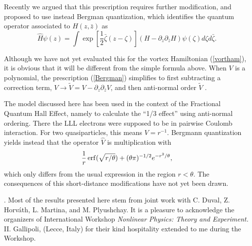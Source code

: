 \documentclass[a4paper,12pt]{article}
\newcommand\half{{\scriptstyle{\frac{1}{2}}}}
\begin{document}
Recently\cite{DH} we argued that 
this prescription requires further modification,
and proposed to use instead 
Bergman  quantization\cite{Bergman}, which identifies
the quantum operator associated to $H(z,\bar{z})$ as
\begin{equation}
    \widehat{H}\psi(z)=
    \int\exp\left[\half\bar{\zeta}(z-\zeta)\right]
    \left(H-\partial_{z}\partial_{\bar{z}}H\right)
    \psi(\zeta)d{\zeta}d\bar{\zeta}.
    \label{Bergman}
\end{equation}

Although we have not yet evaluated this for
the vortex Hamiltonian (\ref{vortham}),
it is obvious that it will be different from the
simple formula above.
When $V$ is a polynomial, the prescription (\ref{Bergman})
simplifies to first subtracting a correction term,
$V\to\widetilde{V}=V-\partial_{z}\partial_{\bar{z}}V$,
and then anti-normal order $\widetilde{V}$ \cite{Bergman}.

The model discussed here has been used in the context of
the Fractional Quantum Hall Effect, namely 
to calculate the ``1/3 effect''\cite{GJ,QHE}
using anti-normal ordering. 
There the LLL electrons were supposed to be in pairwise 
Coulomb interaction. For two quasiparticles, this means $V=r^{-1}$. 
Bergmann quantization yields\cite{Bergman} instead that the operator 
$\widehat{V}$  is multiplication with
\begin{equation}
\frac{1}{r}\,{\rm erf}(\sqrt{r/\theta})+(\theta\pi)^{-1/2}
e^{-r^2/\theta},
\label{BCoulop}
\end{equation}
which only differs from the usual expression in the region 
$r<\theta$. The consequences of this short-distance modifications
have not yet been drawn.

\vskip2mm
.
Most of the results presented here stem from
joint work with C. Duval, Z. Horv\'ath, L. Martina, and M. Plyushchay.
It is a pleasure to acknowledge the organizers of
International Workshop {\it Nonlinear Physics: Theory and Experiment. 
}{\rm II}. Gallipoli, (Lecce, Italy)
for their kind hospitality extended to me during the Workshop.
\end{document}
